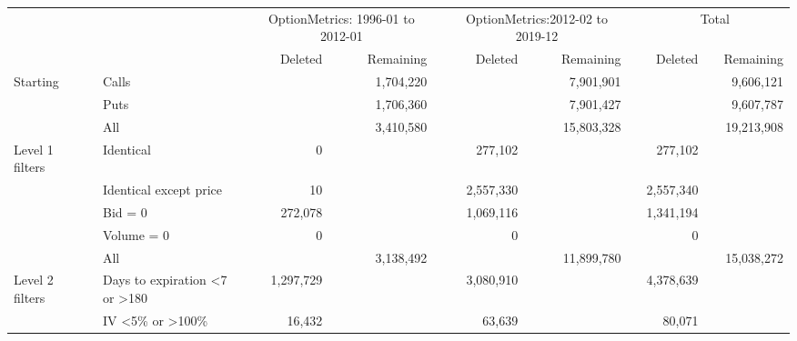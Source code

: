 

    \begin{tabular}{*{4}{l} *{11}{r} }
       
        
         \multicolumn{4}{c}{}  & \multicolumn{3}{c}{OptionMetrics: 1996-01 to 2012-01}  &  \multicolumn{1}{c}{} & 
         \multicolumn{3}{c}{OptionMetrics:2012-02 to 2019-12}&  \multicolumn{1}{c}{}  &
          \multicolumn{3}{c}{Total}  \\
         \cline{5-7}
                  
         \cline{9-11}
         \cline{13-15}
         
          &  & & & 
          Deleted &  & Remaining & &
          Deleted &  & Remaining & &
          Deleted &  & Remaining 
          \\

       \hline

	
				Starting & & Calls & &
				 & & 1,704,220 & &
				 & & 7,901,901 & &
				 & & 9,606,121 \\
			
				  & & Puts & &
				 & & 1,706,360 & &
				 & & 7,901,427 & &
				 & & 9,607,787 \\
			
				  & & All & &
				 & & 3,410,580 & &
				 & & 15,803,328 & &
				 & & 19,213,908 \\
			
				Level 1 filters & & Identical & &
				0 & &  & &
				277,102 & &  & &
				277,102 & &  \\
			
				  & & Identical except price & &
				10 & &  & &
				2,557,330 & &  & &
				2,557,340 & &  \\
			
				  & & Bid = 0 & &
				272,078 & &  & &
				1,069,116 & &  & &
				1,341,194 & &  \\
			
				  & & Volume = 0 & &
				0 & &  & &
				0 & &  & &
				0 & &  \\
			
				  & & All & &
				 & & 3,138,492 & &
				 & & 11,899,780 & &
				 & & 15,038,272 \\
			
				Level 2 filters & & Days to expiration <7 or >180 & &
				1,297,729 & &  & &
				3,080,910 & &  & &
				4,378,639 & &  \\
			
				  & & IV <5\% or >100\% & &
				16,432 & &  & &
				63,639 & &  & &
				80,071 & &  \\
			

\end{tabular}
